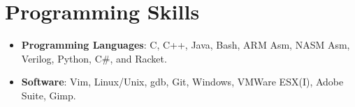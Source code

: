 \documentclass[letterpaper,11pt]{article}
\newcommand{\resumeItem}[2]{
  \item\small{
    \textbf{#1}{: #2 \vspace{-2pt}}
  }
}
\newcommand{\resumeSubItem}[2]{\resumeItem{#1}{#2}\vspace{-4pt}}
\newcommand{\resumeSubHeadingListStart}{\begin{itemize}[leftmargin=*]\vspace{-2pt}}
\newcommand{\resumeSubHeadingListEnd}{\end{itemize}}
\begin{document}
\section{Programming Skills}
  \resumeSubHeadingListStart
  \resumeSubItem{Programming Languages}
                {C, C++, Java, Bash, ARM Asm, NASM Asm, Verilog, Python, C\#, and Racket.}
  \resumeSubItem{Software}
				{Vim, Linux/Unix, gdb, Git, Windows, VMWare ESX(I), Adobe Suite, Gimp.}
  \resumeSubHeadingListEnd


\end{document}
